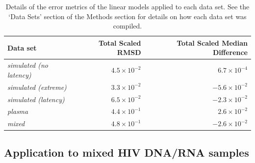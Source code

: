 \documentclass{bmcart}
\begin{document}
\begin{table}
\def\arraystretch{1.3}%
\begin{center}
\begin{tabular}{lrr}
Data set & Total Scaled RMSD & Total Scaled Median Difference \\ %
\hline
\emph{simulated (no latency)} & $4.5 \times 10^{-2}$ & $6.7 \times 10^{-4}$ \\%
\emph{simulated (extreme)} & $3.3 \times 10^{-2}$ & $-5.6 \times 10^{-2}$ \\ %
\emph{simulated (latency)} & $6.5 \times 10^{-2}$ & $-2.3 \times 10^{-2}$ \\ %
\emph{plasma} & $4.4 \times 10^{-1}$ & $2.6 \times 10^{-2}$ \\ %
\emph{mixed} & $4.8 \times 10^{-1}$ & $-2.6 \times 10^{-2}$ \\ %
\hline
\end{tabular}
\end{center}
 \caption{
 {Details of the error metrics of the linear models applied to each data set. See the `Data Sets' section of the Methods section for details on how each data set was compiled.}
 }\label{tab:error} 
\end{table}

\subsection * {Application to mixed HIV DNA/RNA samples} \label{sec:mixed_data}

\end{document}
